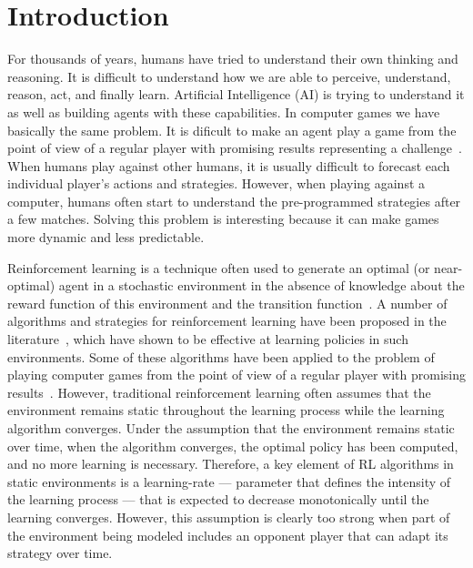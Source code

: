 \chapter{Introduction}
\label{chapter:introduction}

For thousands of years, humans have tried to understand their own thinking and reasoning.
It is difficult to understand how we are able to perceive, understand, reason, act, and finally learn.
Artificial Intelligence (AI) is trying to understand it as well as building agents with these capabilities.
In computer games we have basically the same problem.
It is dificult to make an agent play a game from the point of view of a regular player with promising results representing a challenge~\cite{taylor2011teachingmario,mohan2010ralationalmario}.
When humans play against other humans, it is usually difficult to forecast each individual player's actions and strategies.
However, when playing against a computer, humans often start to understand the pre-programmed strategies after a few matches.
Solving this problem is interesting because it can make games more dynamic and less predictable.

Reinforcement learning is a technique often used to generate an optimal (or near-optimal) agent in a stochastic environment in the absence of knowledge about the reward function of this environment and the transition function~\cite{kaelbling1996reinforcement}. 
A number of algorithms and strategies for reinforcement learning have been proposed in the literature~\cite{stone2005reinforcement,graepel2004learningfight}, which have shown to be effective at learning policies in such environments. 
Some of these algorithms have been applied to the problem of playing computer games from the point of view of a regular player with promising results~\cite{taylor2011teachingmario,mohan2010ralationalmario}. 
However, traditional reinforcement learning often assumes that the environment remains static throughout the learning process while the learning algorithm converges.
Under the assumption that the environment remains static over time, when the algorithm converges, the optimal policy has been computed, and no more learning is necessary. 
Therefore, a key element of RL algorithms in static environments is a learning-rate --- parameter that defines the intensity of the learning process --- that is expected to decrease monotonically until the learning converges. 
However, this assumption is clearly too strong when part of the environment being modeled includes an opponent player that can adapt its strategy over time. 

